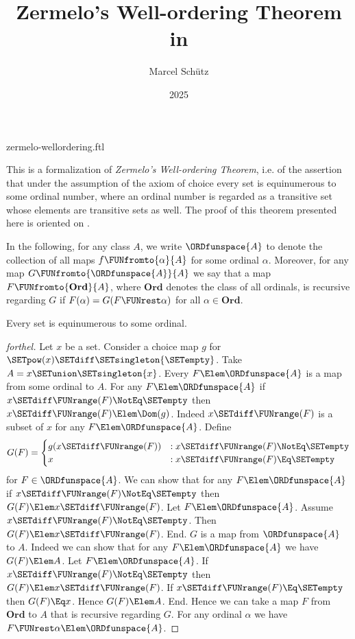 \documentclass{stex}
\title{Zermelo's Well-ordering Theorem in \Naproche}
\author{Marcel Schütz}
\date{2025}
\newcommand\Ord{\textbf{Ord}}
\begin{document}
\begin{smodule}{zermelo-wellordering.ftl}
\maketitle


\noindent This is a formalization of \textit{Zermelo's Well-ordering Theorem},
i.e. of the assertion that under the assumption of the axiom of choice every
set is equinumerous to some ordinal number, where an ordinal number is
regarded as a transitive set whose elements are transitive sets as well.
The proof of this theorem presented here is oriented on \cite{Koepke2018}.

In the following, for any class $A$, we write $\ORDfunspace{A}$ to
denote the collection of all maps $f \FUNfromto{\alpha}{A}$ for some ordinal
$\alpha$.
Moreover, for any map $G \FUNfromto{\ORDfunspace{A}}{A}$ we say that a map
$F \FUNfromto{\Ord}{A}$, where $\Ord$ denotes the class of all ordinals, is
recursive regarding $G$ if $F(\alpha) = G(F \FUNrest \alpha)$ for all
$\alpha \in \Ord$.

\begin{theorem}[forthel,title=Zermelo's Well-Ordering Theorem,id=zermelo]
  Every set is equinumerous to some ordinal.
\end{theorem}
\begin{proof}[forthel]
  Let $x$ be a set.
  Consider a choice map $g$ for $\SETpow(x) \SETdiff \SETsingleton{\SETempty}$.
  Take $A = x \SETunion \SETsingleton{x}$.
  Every $F \Elem \ORDfunspace{A}$ is a map from some ordinal to $A$.
  For any $F \Elem \ORDfunspace{A}$ if $x \SETdiff \FUNrange(F) \NotEq \SETempty$ then $x \SETdiff \FUNrange(F) \Elem \Dom(g)$.
  Indeed $x \SETdiff \FUNrange(F)$ is a subset of $x$ for any $F \Elem \ORDfunspace{A}$.
  Define \[ G(F) =
    \begin{cases}
      g(x \SETdiff \FUNrange(F))
      & : x \SETdiff \FUNrange(F) \NotEq \SETempty
      \\
      x
      & : x \SETdiff \FUNrange(F) \Eq \SETempty
    \end{cases} \]
  for $F \in \ORDfunspace{A}$.
  We can show that for any $F \Elem \ORDfunspace{A}$ if $x \SETdiff \FUNrange(F) \NotEq \SETempty$ then $G(F) \Elem x \SETdiff \FUNrange(F)$.
    Let $F \Elem \ORDfunspace{A}$.
    Assume $x \SETdiff \FUNrange(F) \NotEq \SETempty$.  
    Then $G(F) \Elem x \SETdiff \FUNrange(F)$.
  End.
  $G$ is a map from $\ORDfunspace{A}$ to $A$.
  Indeed we can show that for any $F \Elem \ORDfunspace{A}$ we have $G(F) \Elem A$.
    Let $F \Elem \ORDfunspace{A}$.
    If $x \SETdiff \FUNrange(F) \NotEq \SETempty$ then $G(F) \Elem x \SETdiff \FUNrange(F)$.
    If $x \SETdiff \FUNrange(F) \Eq \SETempty$ then $G(F) \Eq x$.
    Hence $G(F) \Elem A$.
  End.
  Hence we can take a map $F$ from $\Ord$ to $A$ that is recursive regarding $G$.
  For any ordinal $\alpha$ we have $F \FUNrest \alpha \Elem \ORDfunspace{A}$.


\end{proof}
\end{smodule}
\end{document}

